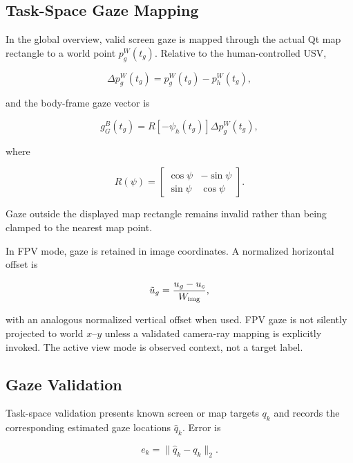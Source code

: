 \documentclass[conference]{IEEEtran}
\begin{document}
\subsection{Task-Space Gaze Mapping}

In the global overview, valid screen gaze is mapped through the actual Qt map
rectangle to a world point $p_g^W(t_g)$. Relative to the human-controlled USV,

\begin{equation}
\Delta p_g^W(t_g)=p_g^W(t_g)-p_h^W(t_g),
\label{eq:gaze_relative_world}
\end{equation}

and the body-frame gaze vector is

\begin{equation}
g_G^B(t_g)=R[-\psi_h(t_g)]\Delta p_g^W(t_g),
\label{eq:gaze_body}
\end{equation}

where

\begin{equation}
R(\psi)=
\begin{bmatrix}
\cos\psi&-\sin\psi\\
\sin\psi&\cos\psi
\end{bmatrix}.
\label{eq:rotation}
\end{equation}

Gaze outside the displayed map rectangle remains invalid rather than being
clamped to the nearest map point.

In FPV mode, gaze is retained in image coordinates. A normalized horizontal
offset is

\begin{equation}
\tilde u_g=\frac{u_g-u_c}{W_{\rm img}},
\label{eq:fpv_gaze}
\end{equation}

with an analogous normalized vertical offset when used. FPV gaze is not
silently projected to world $x$--$y$ unless a validated camera-ray mapping is
explicitly invoked. The active view mode is observed context, not a target
label.

\subsection{Gaze Validation}

Task-space validation presents known screen or map targets $q_k$ and records the
corresponding estimated gaze locations $\hat q_k$. Error is

\begin{equation}
e_k=\|\hat q_k-q_k\|_2.
\label{eq:gaze_error}
\end{equation}
\end{document}
